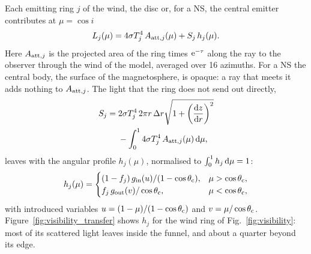 Each emitting ring $j$ of the wind, the disc or, for a NS, the central emitter contributes at $\mu = \cos i$
\begin{equation}
L_j(\mu) = 4\sigma T_j^4\,A_{{\rm att},j}(\mu) + S_j\,h_j(\mu) .
\label{eq:Lj_transfer}
\end{equation}
Here $A_{{\rm att},j}$ is the projected area of the ring times ${\rm e}^{-\tau}$ along the ray to the observer through the wind of the model, averaged over 16 azimuths.
For a NS the central body, the surface of the magnetosphere, is opaque: a ray that meets it adds nothing to $A_{{\rm att},j}$.
The light that the ring does not send out directly,
\begin{equation}
\begin{split}
S_j = {} & 2\sigma T_j^4\,2\pi r\,\Delta r\sqrt{1 + \left(\frac{{\rm d}z}{{\rm d}r}\right)^2} \\
& - \int_0^1 4\sigma T_j^4\,A_{{\rm att},j}(\mu)\,{\rm d}\mu ,
\end{split}
\label{eq:Sj}
\end{equation}
leaves with the angular profile $h_j(\mu)$, normalised to $\int_0^1 h_j\,{\rm d}\mu = 1$:
\begin{equation}
h_j(\mu) =
\begin{cases}
(1 - f_j)\,g_{\rm in}(u)/(1 - \cos\theta_{\rm c}), & \mu > \cos\theta_{\rm c}, \\
f_j\,g_{\rm out}(v)/\cos\theta_{\rm c}, & \mu < \cos\theta_{\rm c},
\end{cases}
\label{eq:hj}
\end{equation}
with introduced variables $u = (1 - \mu)/(1 - \cos\theta_{\rm c})$ and $v = \mu/\cos\theta_{\rm c}$.
{Figure~\ref{fig:visibility_transfer} shows $h_j$ for the wind ring of Fig.~\ref{fig:visibility}: most of its scattered light leaves inside the funnel, and about a quarter beyond its edge.}

